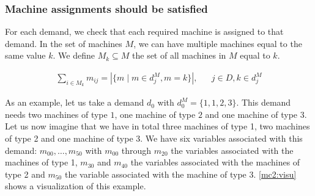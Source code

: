 \documentclass[../../thesis.tex]{subfiles}
\begin{document}
\subsubsection{Machine assignments should be satisfied}

For each demand, we check that each required machine is assigned to that demand.
In the set of machines $M$, we can have multiple machines equal to the same value $k$.
We define $M_k \subseteq M$ the set of all machines in $M$ equal to $k$.

\begin{align}
  \sum_{i \in M_k} m_{ij} = | \{ m \mid m \in d_j^M, m = k \} |, && j \in D, k \in d^M_j \label{mc2}
\end{align}


As an example, let us take a demand $d_0$ with $d_0^M = \{ 1, 1, 2, 3 \}$. This demand needs 
two machines of type $1$, one machine of type $2$ and one machine of type $3$.
Let us now imagine that we have in total three machines of type 1, two machines of type 2 and one machine of type 3.
We have six variables associated with this demand: $m_{00}, \dots, m_{50}$ with 
$m_{00}$ through $m_{20}$ the variables associated with the machines of type 1, $m_{30}$ and $m_{40}$ the variables 
associated with the machines of type 2 and $m_{50}$ the variable associated with the machine of type 3.
\autoref{mc2:visu} shows a visualization of this example.
\end{document}
